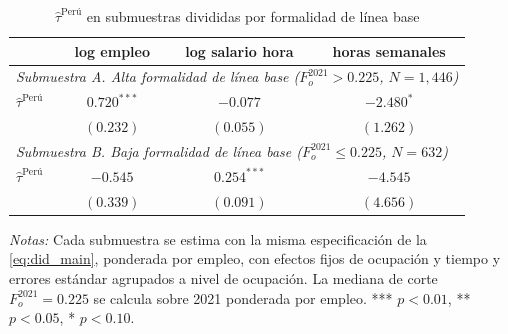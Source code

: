 \begin{table}[H]
\centering
\small
\begin{threeparttable}
\caption{$\hat\tau^{\text{Per\'{u}}}$ en submuestras divididas por formalidad de l\'{i}nea base}
\label{tab:peru_formality_split}
\begin{tabular}{l c c c}
\toprule
                                                & log empleo               & log salario hora       & horas semanales       \\
\midrule
\multicolumn{4}{l}{\emph{Submuestra A. Alta formalidad de l\'{i}nea base ($F_o^{2021} > 0.225$, $N = 1{,}446$)}} \\
$\hat\tau^{\text{Per\'{u}}}$                    & $\mathbf{0.720^{***}}$    & $-0.077$               & $-2.480^{*}$          \\
                                                & $(0.232)$                 & $(0.055)$              & $(1.262)$             \\
\midrule
\multicolumn{4}{l}{\emph{Submuestra B. Baja formalidad de l\'{i}nea base ($F_o^{2021} \leq 0.225$, $N = 632$)}} \\
$\hat\tau^{\text{Per\'{u}}}$                    & $-0.545$                  & $\mathbf{0.254^{***}}$ & $-4.545$              \\
                                                & $(0.339)$                 & $(0.091)$              & $(4.656)$             \\
\bottomrule
\end{tabular}
\begin{tablenotes}[flushleft]
\footnotesize
\item \emph{Notas:} Cada submuestra se estima con la misma especificaci\'{o}n de la \cref{eq:did_main}, ponderada por empleo, con efectos fijos de ocupaci\'{o}n y tiempo y errores est\'{a}ndar agrupados a nivel de ocupaci\'{o}n. La mediana de corte $F_o^{2021} = 0.225$ se calcula sobre 2021 ponderada por empleo. *** $p<0.01$, ** $p<0.05$, * $p<0.10$.
\end{tablenotes}
\end{threeparttable}
\end{table}
